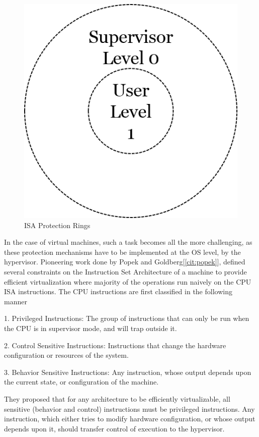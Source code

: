 \begin{figure}[H]
  \centering
  \includegraphics[scale=0.6]{figures/protect_levels.png}
  \caption{ISA Protection Rings}
  \label{fig:protect_2}
\end{figure}
In the case of virtual machines, such a task becomes all the more challenging, as these protection mechanisms have to be implemented at the OS level, by the hypervisor. Pioneering work done by Popek and Goldberg[\ref{cit:popek}], defined several constraints on the Instruction Set Architecture of a machine to provide efficient virtualization where majority of the operations run naively on the CPU ISA instructions. The CPU instructions are first classified in the following manner

1. Privileged Instructions: The group of instructions that can only be run when the CPU is in supervisor mode, and will trap outside it.

2. Control Sensitive Instructions: Instructions that change the hardware configuration or resources of the system.

3. Behavior Sensitive Instructions: Any instruction, whose output depends upon the current state, or configuration of the machine.

They proposed that for any architecture to be efficiently virtualizable, all sensitive (behavior and control) instructions must be privileged instructions. Any instruction, which either tries to modify hardware configuration, or whose output depends upon it, should transfer control of execution to the hypervisor.

